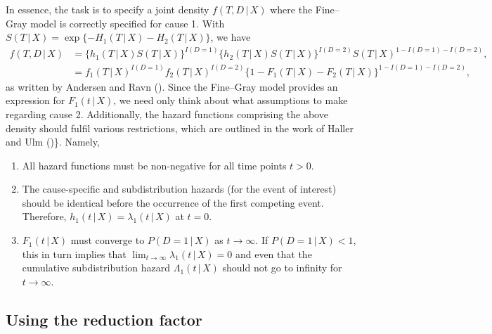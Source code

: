 \documentclass[
  letterpaper,
  DIV=11,
  numbers=noendperiod]{scrreprt}
\providecommand{\tightlist}{%
  \setlength{\itemsep}{0pt}\setlength{\parskip}{0pt}}\usepackage{longtable,booktabs,array}
\newcommand{\given}{\,|\,}
\begin{document}
In essence, the task is to specify a joint density \(f(T, D \given X)\)
where the Fine--Gray model is correctly specified for cause 1. With
\(S(T \given X) = \exp\{-H_1(T \given X) - H_2(T \given X)\}\), we have
\begin{align*}
    f(T,D \given X) &= \{h_1(T \given X)S(T \given X)\}^{I(D = 1)}\{h_2(T \given X)S(T \given X)\}^{I(D = 2)}S(T \given X)^{1 - I(D = 1) - I(D = 2)}, \\
    &= f_1(T \given X)^{I(D = 1)}f_2(T \given X)^{I(D = 2)}\{1 - F_1(T \given X) - F_2(T \given X)\}^{1 - I(D = 1) - I(D = 2)},
\end{align*} as written by Andersen and Ravn
(). Since the
Fine--Gray model provides an expression for \(F_1(t \given X)\), we need
only think about what assumptions to make regarding cause 2.
Additionally, the hazard functions comprising the above density should
fulfil various restrictions, which are outlined in the work of Haller
and Ulm ()\}.
Namely,

\begin{enumerate}
\def\labelenumi{\arabic{enumi}.}
\tightlist
\item
  All hazard functions must be non-negative for all time points
  \(t > 0\).
\item
  The cause-specific and subdistribution hazards (for the event of
  interest) should be identical before the occurrence of the first
  competing event. Therefore,
  \(h_1(t \given X) = \lambda_1(t \given X)\) at \(t = 0\).
\item
  \(F_1(t \given X)\) must converge to \(P(D = 1 \given X)\) as
  \(t \to \infty\). If \(P(D = 1 \given X) < 1\), this in turn implies
  that \(\lim_{t \to \infty} \lambda_1(t \given X) = 0\) and even that
  the cumulative subdistribution hazard \(\Lambda_1(t \given X)\) should
  not go to infinity for \(t \to \infty\).
\end{enumerate}

\subsection{Using the reduction
factor}\label{using-the-reduction-factor}
\end{document}
